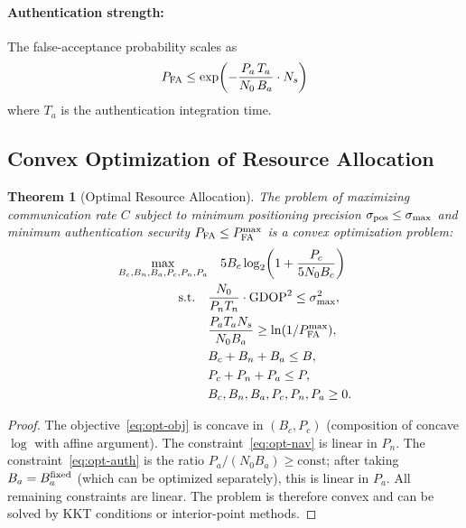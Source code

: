 \documentclass[twocolumn,superscriptaddress,prd,nofootinbib]{revtex4-2}
\newtheorem{theorem}{Theorem}
\begin{document}
\paragraph{Authentication strength:}
The false-acceptance probability scales as
\begin{equation}
P_{\rm FA} \leq \exp\!\left(-\frac{P_a\,T_a}{N_0\,B_a}\cdot N_s\right)
\end{equation}
where $T_a$ is the authentication integration time.

\subsection{Convex Optimization of Resource Allocation}

\begin{theorem}[Optimal Resource Allocation]
\label{thm:resource}
The problem of maximizing communication rate $C$ subject to minimum
positioning precision $\sigma_{\rm pos} \leq \sigma_{\rm max}$ and
minimum authentication security $P_{\rm FA} \leq P_{\rm FA}^{\rm max}$
is a convex optimization problem:
\begin{align}
\max_{B_c,B_n,B_a,P_c,P_n,P_a} &\quad 5B_c\log_2\!\left(1 + \frac{P_c}{5N_0 B_c}\right) \label{eq:opt-obj}\\
\text{s.t.}\quad & \frac{N_0}{P_n T_n}\cdot\text{GDOP}^2 \leq \sigma_{\rm max}^2, \label{eq:opt-nav}\\
& \frac{P_a T_a N_s}{N_0 B_a} \geq \ln(1/P_{\rm FA}^{\rm max}), \label{eq:opt-auth}\\
& B_c + B_n + B_a \leq B, \label{eq:opt-bw}\\
& P_c + P_n + P_a \leq P, \label{eq:opt-power}\\
& B_c, B_n, B_a, P_c, P_n, P_a \geq 0. \label{eq:opt-nonneg}
\end{align}
\end{theorem}

\begin{proof}
The objective~\eqref{eq:opt-obj} is concave in $(B_c, P_c)$ (composition
of concave $\log$ with affine argument). The constraint~\eqref{eq:opt-nav}
is linear in $P_n$. The constraint~\eqref{eq:opt-auth} is the ratio
$P_a/(N_0 B_a) \geq \text{const}$; after taking $B_a = B_a^{\rm fixed}$
(which can be optimized separately), this is linear in $P_a$. All
remaining constraints are linear. The problem is therefore convex and
can be solved by KKT conditions or interior-point methods.
\end{proof}
\end{document}
